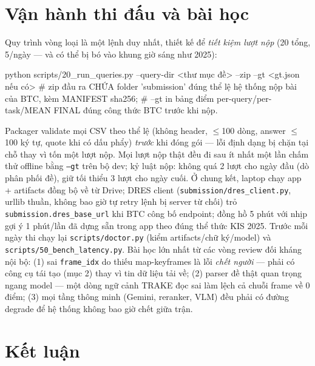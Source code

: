 \documentclass{ai_conquer2026}
\begin{document}
\section{Vận hành thi đấu và bài học}

Quy trình vòng loại là một lệnh duy nhất, thiết kế để \emph{tiết kiệm lượt nộp} (20 tổng,
5/ngày --- và có thể bị bó vào khung giờ sáng như 2025):

\begin{aivnoutputbox}
python scripts/20_run_queries.py --query-dir <thư mục đề> --zip --gt <gt.json nếu có>
# zip đầu ra CHỨA folder 'submission' đúng thể lệ hệ thống nộp bài của BTC, kèm MANIFEST sha256;
# --gt in bảng điểm per-query/per-task/MEAN FINAL đúng công thức BTC trước khi nộp.
\end{aivnoutputbox}

Packager validate mọi CSV theo thể lệ (không header, $\le$100 dòng, answer $\le$100 ký tự,
quote khi có dấu phẩy) \emph{trước} khi đóng gói --- lỗi định dạng bị chặn tại chỗ thay vì
tốn một lượt nộp. Mọi lượt nộp thật đều đi sau ít nhất một lần chấm thử offline bằng
\texttt{--gt} trên bộ dev; kỷ luật nộp: không quá 2 lượt cho ngày đầu (dò phân phối đề),
giữ tối thiểu 3 lượt cho ngày cuối. Ở chung kết, laptop chạy app + artifacts đồng bộ về từ
Drive; DRES client (\texttt{submission/dres\_client.py}, urllib thuần, không bao giờ tự retry
lệnh bị server từ chối) trỏ \texttt{submission.dres\_base\_url} khi BTC công bố endpoint;
đồng hồ 5 phút với nhịp gợi ý 1 phút/lần đã dựng sẵn trong app theo đúng thể thức KIS 2025.
Trước mỗi ngày thi chạy lại \texttt{scripts/doctor.py} (kiểm artifacts/chữ ký/model) và
\texttt{scripts/50\_bench\_latency.py}. Bài học lớn nhất từ các vòng review đối kháng nội bộ:
(1) sai \texttt{frame\_idx} do thiếu map-keyframes là lỗi \emph{chết người} --- phải có công
cụ tái tạo (mục 2) thay vì tin dữ liệu tải về; (2) parser đề thật quan trọng ngang model ---
một dòng ngữ cảnh TRAKE đọc sai làm lệch cả chuỗi frame về 0 điểm; (3) mọi tầng thông minh
(Gemini, reranker, VLM) đều phải có đường degrade để hệ thống không bao giờ chết giữa trận.

\section{Kết luận}
\end{document}
